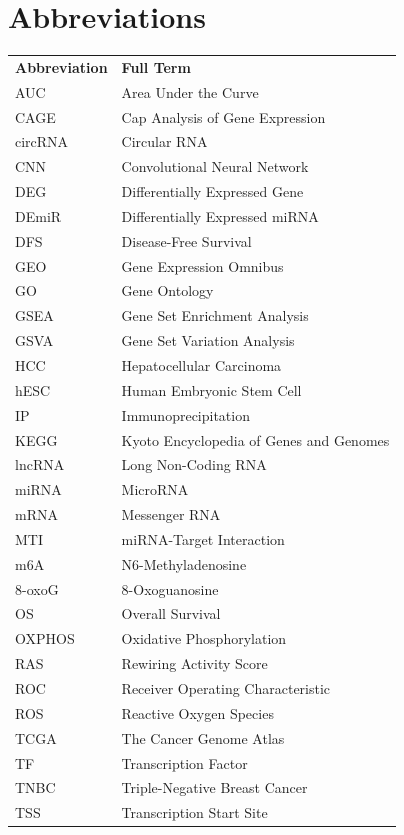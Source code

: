\chapter{Abbreviations}


\begin{tabular}{ll}
  \textbf{Abbreviation} & \textbf{Full Term} \\[0.5em]
  AUC     & Area Under the Curve \\
  CAGE    & Cap Analysis of Gene Expression \\
  circRNA & Circular RNA \\
  CNN     & Convolutional Neural Network \\
  DEG     & Differentially Expressed Gene \\
  DEmiR   & Differentially Expressed miRNA \\
  DFS     & Disease-Free Survival \\
  GEO     & Gene Expression Omnibus \\
  GO      & Gene Ontology \\
  GSEA    & Gene Set Enrichment Analysis \\
  GSVA    & Gene Set Variation Analysis \\
  HCC     & Hepatocellular Carcinoma \\
  hESC    & Human Embryonic Stem Cell \\
  IP      & Immunoprecipitation \\
  KEGG    & Kyoto Encyclopedia of Genes and Genomes \\
  lncRNA  & Long Non-Coding RNA \\
  miRNA   & MicroRNA \\
  mRNA    & Messenger RNA \\
  MTI     & miRNA-Target Interaction \\
  m6A     & N6-Methyladenosine \\
  8-oxoG  & 8-Oxoguanosine \\
  OS      & Overall Survival \\
  OXPHOS  & Oxidative Phosphorylation \\
  RAS     & Rewiring Activity Score \\
  ROC     & Receiver Operating Characteristic \\
  ROS     & Reactive Oxygen Species \\
  TCGA    & The Cancer Genome Atlas \\
  TF      & Transcription Factor \\
  TNBC    & Triple-Negative Breast Cancer \\
  TSS     & Transcription Start Site \\
\end{tabular}
